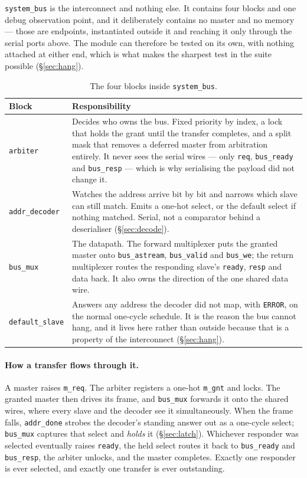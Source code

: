 \documentclass[11pt,a4paper]{article}
\newcommand{\sig}[1]{\texttt{#1}}
\begin{document}
\sig{system\_bus} is the interconnect and nothing else. It contains four
blocks and one debug observation point, and it deliberately contains no
master and no memory --- those are endpoints, instantiated outside it and
reaching it only through the serial ports above. The module can therefore be
tested on its own, with nothing attached at either end, which is what makes
the sharpest test in the suite possible (\S\ref{sec:hang}).

\begin{table}[htb]
\centering\small
\caption{The four blocks inside \sig{system\_bus}.}
\begin{tabularx}{\textwidth}{@{}lX@{}}
\toprule
\textbf{Block} & \textbf{Responsibility}\\
\midrule
\sig{arbiter} &
Decides who owns the bus. Fixed priority by index, a lock that holds the
grant until the transfer completes, and a split mask that removes a deferred
master from arbitration entirely. It never sees the serial wires --- only
\sig{req}, \sig{bus\_ready} and \sig{bus\_resp} --- which is why serialising
the payload did not change it.\\
\addlinespace
\sig{addr\_decoder} &
Watches the address arrive bit by bit and narrows which slave can still
match. Emits a one-hot select, or the default select if nothing matched.
Serial, not a comparator behind a deserialiser (\S\ref{sec:decode}).\\
\addlinespace
\sig{bus\_mux} &
The datapath. The forward multiplexer puts the granted master onto
\sig{bus\_astream}, \sig{bus\_valid} and \sig{bus\_we}; the return
multiplexer routes the responding slave's \sig{ready}, \sig{resp} and data
back. It also owns the direction of the one shared data wire.\\
\addlinespace
\sig{default\_slave} &
Answers any address the decoder did not map, with \sig{ERROR}, on the normal
one-cycle schedule. It is the reason the bus cannot hang, and it lives here
rather than outside because that is a property of the interconnect
(\S\ref{sec:hang}).\\
\bottomrule
\end{tabularx}
\end{table}

\paragraph{How a transfer flows through it.}
A master raises \sig{m\_req}. The arbiter registers a one-hot \sig{m\_gnt}
and locks. The granted master then drives its frame, and \sig{bus\_mux}
forwards it onto the shared wires, where every slave and the decoder see it
simultaneously. When the frame falls, \sig{addr\_done} strobes the decoder's
standing answer out as a one-cycle select; \sig{bus\_mux} captures that select
and \emph{holds} it (\S\ref{sec:latch}). Whichever responder was selected
eventually raises \sig{ready}, the held select routes it back to
\sig{bus\_ready} and \sig{bus\_resp}, the arbiter unlocks, and the master
completes. Exactly one responder is ever selected, and exactly one transfer
is ever outstanding.
\end{document}
